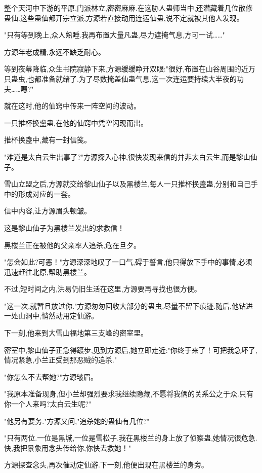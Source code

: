 \begin{this_body}
整个天河中下游的平原,门派林立,密密麻麻.在这胁人蛊师当中,还潜藏着几位散修蛊仙.这些蛊仙都开宗立派,方源若直接动用连运仙蛊,说不定就被其他人发现。

"只有等到晚上,众人熟睡.我再布置大量凡蛊,尽力遮掩气息,方可一试……"

方源年老成精,永远不缺乏耐心。

等到夜幕降临,众生书院寂静下来,方源缓缓睁开双眼:"很好,布置在山谷周围的近万只蛊虫,也都准备就绪了.为了尽数掩盖仙蛊气息,这一次连运要持续大半夜的功夫……嗯?"

就在这时,他的仙窍中传来一阵空间的波动。

一只推杯换盏蛊,在他的仙窍中凭空闪现而出。

推杯换盏中,藏有一封信笺。

"难道是太白云生出事了?"方源探入心神,很快发现来信的并非太白云生,而是黎山仙子。

雪山立盟之后,方源就交给黎山仙子以及黑楼兰,每人一只推杯换盏蛊,分别和自己手中的形成对应的一套。

信中内容,让方源眉头顿皱。

这是黎山仙子为黑楼兰发出的求救信！

黑楼兰正在被他的父亲率人追杀,危在旦夕。

"怎会如此?可恶！"方源深深地叹了一口气,碍于誓言,他只得放下手中的事情,必须迅速赶往北原,帮助黑楼兰。

不过,短时间之内,洪易仍旧生活在这里,方源要再寻找也很方便。

"这一次,就暂且放过你."方源匆匆回收大部分的蛊虫,尽量不留下痕迹.随后,他钻进一处山洞中,悄然动用定仙游。

下一刻,他来到大雪山福地第三支峰的密室里。

密室中,黎山仙子正急得踱步,见到方源后,她立即走近:"你终于来了！可把我急坏了,情况紧急,小兰正受到那恶贼的追杀."

"你怎么不去帮她?"方源皱眉。

"我原本准备现身,但小兰却强烈要求我继续隐藏,不愿将我俩的关系公之于众.只有你一个人来吗?太白云生呢?"

"他另有要务."方源又问,"追杀她的蛊仙有几位?"

"只有两位.一位是黑城,一位是雪松子.我在黑楼兰的身上放了侦察蛊,她情况很危急.快,我把景象用念头传给你,你快去救她！"

方源探查念头,再次催动定仙游.下一刻,他便出现在黑楼兰的身旁。

\end{this_body}

